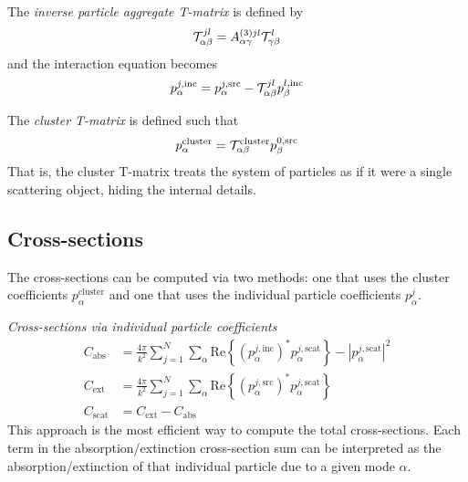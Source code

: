 \documentclass[11pt]{article}
\begin{document}
The \emph{inverse particle aggregate T-matrix} is defined by 
\begin{equation}
    \mathcal{T}_{\alpha\beta}^{jl} =
    A_{\alpha \gamma}^{(3)jl}
    \mathcal{T}_{\gamma \beta}^l
\label{eqn:particle_aggregate_tmatrix}
\end{equation}
and the interaction equation becomes
\begin{equation}
    p_{\alpha}^{j,\text{inc}} = 
    p_{\alpha}^{j,\text{src}} -
    \mathcal{T}_{\alpha \beta}^{jl}
    p_{\beta}^{l,\text{inc}}
\end{equation}

The \emph{cluster T-matrix} is defined such that
\begin{equation}
    p_\alpha^{\text{cluster}} = \mathcal{T}_{\alpha\beta}^{\text{cluster}} p_\beta^{0,\text{src}}
\label{eqn:cluster_tmatrix}
\end{equation}
That is, the cluster T-matrix treats the system of particles as if it were a single scattering object, hiding the internal details.

\subsection{Cross-sections}

The cross-sections can be computed via two methods: one that uses the cluster coefficients $p_\alpha^\text{cluster}$ and one that uses the individual particle coefficients $p_\alpha^j$.

\hfill

\textit{Cross-sections via individual particle coefficients}
\begin{subequations}
\begin{align}
    C_\text{abs} &= \frac{4\pi}{k^2} \sum_{j=1}^N \sum_{\alpha}
    \text{Re} \left\{(p_\alpha^{j,\text{inc}})^* p_\alpha^{j,\text{scat}} \right\} 
        - |p_\alpha^{j,\text{scat}}|^2\\
    C_\text{ext} &= \frac{4\pi}{k^2} \sum_{j=1}^N \sum_{\alpha}
    \text{Re} \left\{(p_\alpha^{j,\text{src}})^* p_\alpha^{j,\text{scat}} \right\} \\
    C_\text{scat} &= C_\text{ext} - C_\text{abs}
\end{align}
\label{eqn:cross_sections}
\end{subequations}
This approach is the most efficient way to compute the total cross-sections.
Each term in the absorption/extinction cross-section sum can be interpreted as the absorption/extinction of that individual particle due to a given mode $\alpha$.
\end{document}
